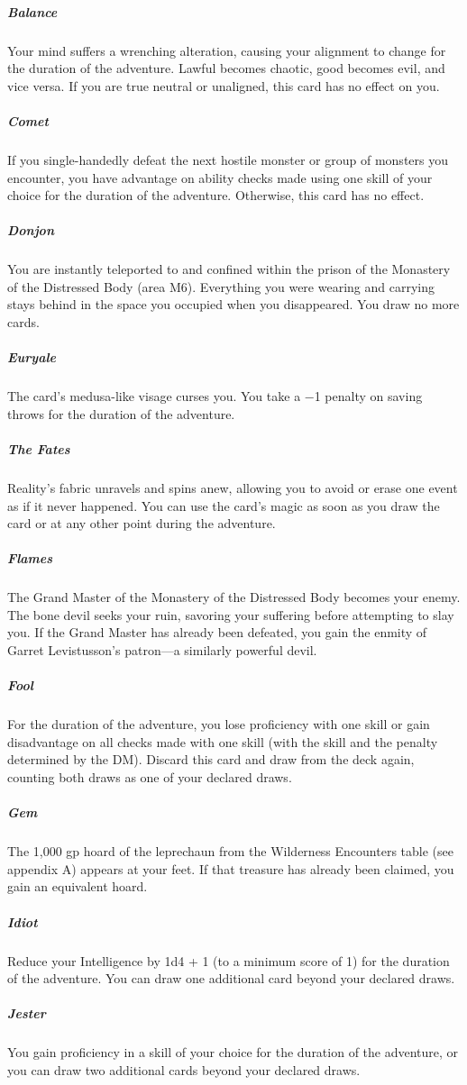 \documentclass[10pt,a4paper,twoside,bg=print,twocolumn,openany,nodeprecatedcode]{dndbook}
\begin{document}
\subparagraph{Balance}
Your mind suffers a wrenching alteration, causing your alignment to change for the duration of the adventure. Lawful becomes chaotic, good becomes evil, and vice versa. If you are true neutral or unaligned, this card has no effect on you.

\subparagraph{Comet}
If you single-handedly defeat the next hostile monster or group of monsters you encounter, you have advantage on ability checks made using one skill of your choice for the duration of the adventure. Otherwise, this card has no effect.

\subparagraph{Donjon}
You are instantly teleported to and confined within the prison of the Monastery of the Distressed Body (area M6). Everything you were wearing and carrying stays behind in the space you occupied when you disappeared. You draw no more cards.

\subparagraph{Euryale}
The card's medusa-like visage curses you. You take a −1 penalty on saving throws for the duration of the adventure.

\subparagraph{The Fates}
Reality's fabric unravels and spins anew, allowing you to avoid or erase one event as if it never happened. You can use the card's magic as soon as you draw the card or at any other point during the adventure.

\subparagraph{Flames}
The Grand Master of the Monastery of the Distressed Body becomes your enemy. The bone devil seeks your ruin, savoring your suffering before attempting to slay you. If the Grand Master has already been defeated, you gain the enmity of Garret Levistusson's patron—a similarly powerful devil.

\subparagraph{Fool}
For the duration of the adventure, you lose proficiency with one skill or gain disadvantage on all checks made with one skill (with the skill and the penalty determined by the DM). Discard this card and draw from the deck again, counting both draws as one of your declared draws.

\subparagraph{Gem}
The 1,000 gp hoard of the leprechaun from the Wilderness Encounters table (see appendix A) appears at your feet. If that treasure has already been claimed, you gain an equivalent hoard.

\subparagraph{Idiot}
Reduce your Intelligence by 1d4 + 1 (to a minimum score of 1) for the duration of the adventure. You can draw one additional card beyond your declared draws.

\subparagraph{Jester}
You gain proficiency in a skill of your choice for the duration of the adventure, or you can draw two additional cards beyond your declared draws.
\end{document}
